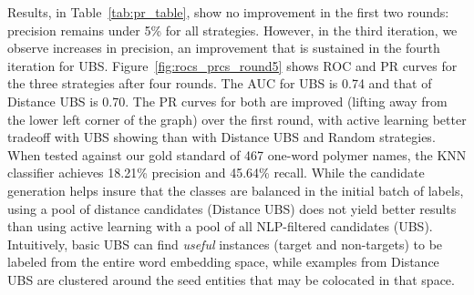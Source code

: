 Results, in Table~\ref{tab:pr_table}, show 
no improvement in the first two rounds: %
precision remains under 5\% for all strategies.
However, in the third iteration, we observe increases in precision,
an improvement that  
is sustained in the fourth iteration for UBS.
Figure~\ref{fig:rocs_prcs_round5} shows ROC and PR curves for the three strategies after four rounds. 
The AUC for UBS is 0.74 and that of Distance UBS is 0.70. 
The PR curves for both are improved (lifting away from the lower left corner of the graph) over the first round, 
with active learning better tradeoff with UBS showing than with Distance UBS and Random strategies.
When tested against our gold standard of 467 one-word polymer names, the KNN classifier achieves 18.21\% precision and  45.64\% recall. 
While the candidate generation helps insure that the classes are balanced in the initial batch of labels, using a pool of distance candidates (Distance UBS) does not yield better results than using active learning with a pool of all NLP-filtered candidates (UBS).
Intuitively, basic UBS can find \textit{useful} instances (target and non-targets) to be labeled from the entire word embedding space, while examples from Distance UBS are clustered around the seed entities that may be colocated in that space.


